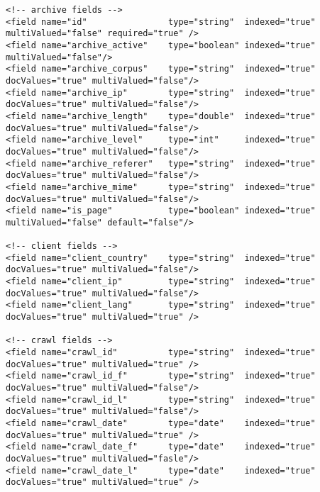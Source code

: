 \documentclass[symmetric,justified,marginals=raggedouter]{tufte-book}
\begin{document}
\begin{fullwidth}
\small
\begin{verbatim}
<!-- archive fields -->
<field name="id"                type="string"  indexed="true"    multiValued="false" required="true" />
<field name="archive_active"    type="boolean" indexed="true"    multiValued="false"/>
<field name="archive_corpus"    type="string"  indexed="true"    docValues="true" multiValued="false"/>
<field name="archive_ip"        type="string"  indexed="true"    docValues="true" multiValued="false"/>
<field name="archive_length"    type="double"  indexed="true"    docValues="true" multiValued="false"/>
<field name="archive_level"     type="int"     indexed="true"    docValues="true" multiValued="false"/>
<field name="archive_referer"   type="string"  indexed="true"    docValues="true" multiValued="false"/>
<field name="archive_mime"      type="string"  indexed="true"    docValues="true" multiValued="false"/>
<field name="is_page"           type="boolean" indexed="true"    multiValued="false" default="false"/>    

<!-- client fields -->
<field name="client_country"    type="string"  indexed="true"    docValues="true" multiValued="false"/>
<field name="client_ip"         type="string"  indexed="true"    docValues="true" multiValued="false"/>
<field name="client_lang"       type="string"  indexed="true"    docValues="true" multiValued="true" />

<!-- crawl fields -->
<field name="crawl_id"          type="string"  indexed="true"    docValues="true" multiValued="true" />
<field name="crawl_id_f"        type="string"  indexed="true"    docValues="true" multiValued="false"/>
<field name="crawl_id_l"        type="string"  indexed="true"    docValues="true" multiValued="false"/>
<field name="crawl_date"        type="date"    indexed="true"    docValues="true" multiValued="true" />
<field name="crawl_date_f"      type="date"    indexed="true"    docValues="true" multiValued="fasle"/>
<field name="crawl_date_l"      type="date"    indexed="true"    docValues="true" multiValued="true" />
\end{verbatim} 
\end{fullwidth}
\end{document}

